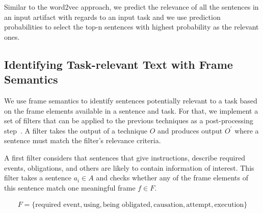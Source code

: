 Similar to the word2vec approach, we predict the relevance of all the sentences in an input artifact with regards to an input task and we use prediction probabilities to select 
the top-n sentences with highest probability as the relevant ones.









\subsection{Identifying Task-relevant Text with Frame Semantics}
\label{cp5:approach-filters}




We use frame semantics to identify sentences potentially relevant to a task based on the frame elements available in a sentence and task. 
For that, we implement a set of filters that can be applied to the previous techniques as a post-processing step~\cite{Manning2009IR}.
A filter takes the output of a technique $O$ and produces output $O^{\prime}$ where a sentence must match the filter's relevance criteria.


A first filter considers that sentences that give instructions, describe required events, obligations, and others 
are likely to contain information of interest. 
This filter takes a sentence $a_i \in A$ and checks whether any of the frame elements of this sentence match one meaningful frame $f \in F$. 





\begin{equation}
\begin{split}
F = \{ \text{required event}, \text{using}, \text{being obligated}, \text{causation}, \text{attempt}, \text{execution} \} 
\end{split}
\end{equation}





